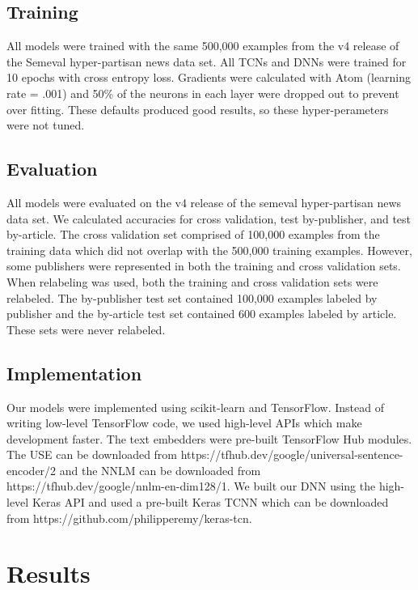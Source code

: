 \documentclass[11pt,a4paper]{article}
\begin{document}
\subsection{Training}

All models were trained with the same 500,000 examples from the v4 release of the Semeval hyper-partisan news data set. All TCNs and DNNs were trained for 10 epochs with cross entropy loss. Gradients were calculated with Atom (learning rate = .001) and 50\% of the neurons in each layer were dropped out to prevent over fitting. These defaults produced good results, so these hyper-perameters were not tuned. 

\subsection{Evaluation}

All models were evaluated on the v4 release of the semeval hyper-partisan news data set. We calculated accuracies for cross validation, test by-publisher, and test by-article. The cross validation set comprised of 100,000 examples from the training data which did not overlap with the 500,000 training examples. However, some publishers were represented in both the training and cross validation sets. When relabeling was used, both the training and cross validation sets were relabeled. The by-publisher test set contained 100,000 examples labeled by publisher and the by-article test set contained 600 examples labeled by article. These sets were never relabeled.

\subsection{Implementation}

Our models were implemented using scikit-learn and TensorFlow. Instead of writing low-level TensorFlow code, we used high-level APIs which make development faster. The text embedders were pre-built TensorFlow Hub modules. The USE can be downloaded from https://tfhub.dev/google/universal-sentence-encoder/2 and the NNLM can be downloaded from https://tfhub.dev/google/nnlm-en-dim128/1. We built our DNN using the high-level Keras API and used a pre-built Keras TCNN which can be downloaded from https://github.com/philipperemy/keras-tcn.

\section{Results}
\end{document}
